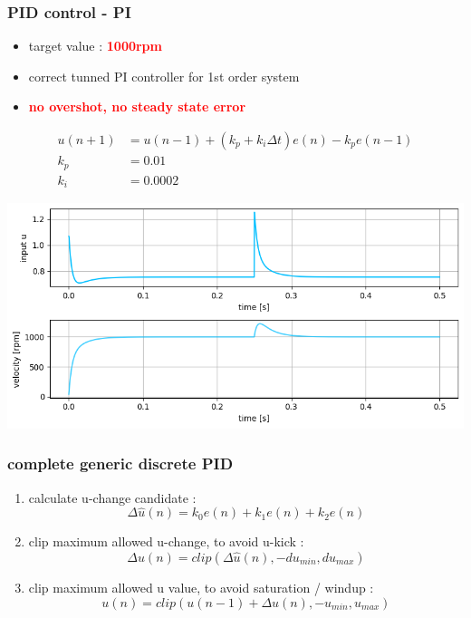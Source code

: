 \documentclass{beamer}
\begin{document}
\begin{frame}
  
  \frametitle{\textbf { PID control - PI}}

  \begin{itemize}
    \item  target value : \textcolor{red}{\textbf { 1000rpm}}
    \item  correct tunned PI controller for 1st order system
    \item  \textcolor{red}{\textbf { no overshot, no steady state error}}
  \end{itemize}

  \begin{align*}
    u(n+1) &= u(n-1) + (k_p + k_i\Delta t) e(n) - k_pe(n-1) \\
    k_p    &= 0.01 \\
    k_i    &= 0.0002
  \end{align*}

  {\centering \includegraphics[scale=0.4]{../images/motor_control/pid_pi_control_1.png}}

\end{frame}



\begin{frame}
  
  \frametitle{\textbf { complete generic discrete PID}}

  \begin{enumerate}
    \item  calculate u-change candidate :
      $$\Delta \hat{u}(n) = k_0e(n) + k_1e(n) + k_2e(n)$$
    
    \item clip maximum allowed u-change, to avoid u-kick :
      $$\Delta u(n) = clip(\Delta \hat{u}(n), -du_{min}, du_{max})$$

    \item clip maximum allowed u value, to avoid saturation / windup :
      $$u(n) = clip(u(n-1) + \Delta u(n), -u_{min}, u_{max})$$
  \end{enumerate}
  
\end{frame}
\end{document}
